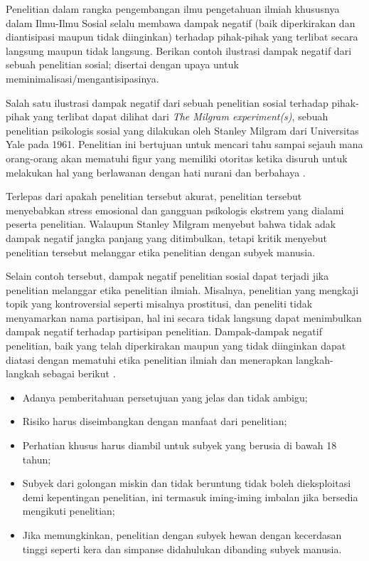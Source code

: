 	\question
Penelitian dalam rangka pengembangan ilmu pengetahuan ilmiah khususnya dalam Ilmu-Ilmu Sosial selalu membawa dampak negatif (baik diperkirakan dan diantisipasi maupun tidak diinginkan) terhadap pihak-pihak yang terlibat secara langsung maupun tidak langsung. 
Berikan contoh ilustrasi dampak negatif dari sebuah penelitian sosial; disertai dengan upaya untuk meminimalisasi/mengantisipasinya.
\begin{solution}
	Salah satu ilustrasi dampak negatif dari sebuah penelitian sosial terhadap pihak-pihak yang terlibat dapat dilihat dari \textit{The Milgram experiment(s)}, sebuah penelitian psikologis sosial yang dilakukan oleh Stanley Milgram dari Universitas Yale pada 1961.
	Penelitian ini bertujuan untuk mencari tahu sampai sejauh mana orang-orang akan mematuhi figur yang memiliki otoritas ketika disuruh untuk melakukan hal yang berlawanan dengan hati nurani dan berbahaya \cite{milgram_behavioral_1963}.
	
	Terlepas dari apakah penelitian tersebut akurat, penelitian tersebut menyebabkan stress emosional dan gangguan psikologis ekstrem yang dialami peserta penelitian.
	Walaupun Stanley Milgram menyebut bahwa tidak adak dampak negatif jangka panjang yang ditimbulkan, tetapi kritik menyebut penelitian tersebut melanggar etika penelitian dengan subyek manusia.
	
	Selain contoh tersebut, dampak negatif penelitian sosial dapat terjadi jika penelitian melanggar etika penelitian ilmiah.
	Misalnya, penelitian yang mengkaji topik yang kontroversial seperti misalnya prostitusi, dan peneliti tidak menyamarkan nama partisipan, hal ini secara tidak langsung dapat menimbulkan dampak negatif terhadap partisipan penelitian.
	Dampak-dampak negatif penelitian, baik yang telah diperkirakan maupun yang tidak diinginkan dapat diatasi dengan mematuhi etika penelitian ilmiah dan menerapkan langkah-langkah sebagai berikut \cite{sass_reichsrundschreiben_1983}.
	\begin{itemize}
		\item Adanya pemberitahuan persetujuan yang jelas dan tidak ambigu;
		\item Risiko harus diseimbangkan dengan manfaat dari penelitian;
		\item Perhatian khusus harus diambil untuk subyek yang berusia di bawah 18 tahun;
		\item Subyek dari golongan miskin dan tidak beruntung tidak boleh dieksploitasi demi kepentingan penelitian, ini termasuk iming-iming imbalan jika bersedia mengikuti penelitian;
		\item Jika memungkinkan, penelitian dengan subyek hewan dengan kecerdasan tinggi seperti kera dan simpanse didahulukan dibanding subyek manusia.
	\end{itemize}
\end{solution}
